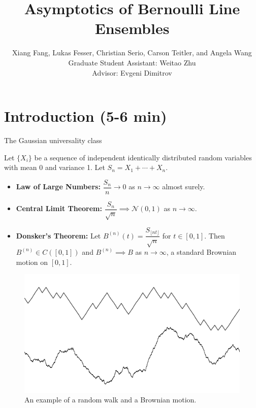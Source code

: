 \documentclass[9pt,t,dvipsnames]{beamer}
\title{Asymptotics of Bernoulli Line Ensembles}
\author[Fang, Fesser, Serio, Teitler, and Wang]{Xiang Fang, Lukas Fesser, Christian Serio, Carson Teitler, and Angela Wang \\
Graduate Student Assistant: Weitao Zhu\\
Advisor: Evgeni Dimitrov}
\institute[Columbia]{Columbia University REU}
\begin{document}
	
	\begin{frame}
		\maketitle
	\end{frame}


\section{Introduction (5-6 min)}

\begin{frame}{The Gaussian universality class}

Let $\{X_i\}$ be a sequence of independent identically distributed random variables with mean 0 and variance 1. Let $S_n = X_1 + \cdots + X_n$.

\bigskip

\begin{itemize}
\item \textbf{Law of Large Numbers:} $\dfrac{S_n}{n} \longrightarrow 0$ as $n \rightarrow \infty$ almost surely.

\bigskip

\item \textbf{Central Limit Theorem:} $\dfrac{S_n}{\sqrt{n}} \implies \mathcal{N}(0, 1)$ as $n \rightarrow \infty$.

\bigskip

\item \textbf{Donsker's Theorem:} Let $B^{(n)}(t) = \dfrac{S_{\lfloor nt\rfloor}}{\sqrt{n}}$ for $t\in [0,1]$. Then $B^{(n)} \in C([0, 1])$ and $B^{(n)} \implies B$ as $n\to\infty$, a standard Brownian motion on $[0,1]$.
\end{itemize}
\begin{figure}
\includegraphics[height=0.29\textheight]{graphics/Gaussian.png}
\caption{An example of a random walk and a Brownian motion.}
\end{figure}

\end{frame}
\end{document}
